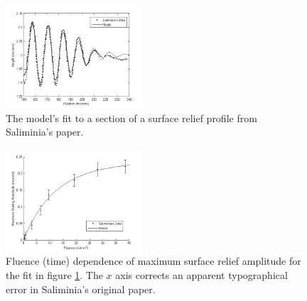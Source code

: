 \documentclass[aps, prl, twocolumn, groupedaddress]{revtex4-1}
\begin{document}
\begin{table}
\begin{ruledtabular}
  \end{ruledtabular}
  \caption{Summary of the parameters used in constructing the fit depicted in figure
                                                                                                                                                                                                                                                                                                                                                                                                                                                                                                                                \ref{fig:sinemodzoom}.} \label{tab:sinemod}
\end{table}

\begin{figure}[!htbp]
  \includegraphics[width=2in]{figure/sinefigurezoom.png}
  \caption{The model's fit to a section of a surface relief profile from Saliminia's paper.}
  \label{fig:sinemodzoom}
\end{figure}

\begin{figure}[!htbp]
  \includegraphics[width=2in]{figure/saliminiagrowth.png}
  \caption{Fluence (time) dependence of maximum surface relief amplitude for the fit in figure \ref{fig:sinemodzoom}. The $x$ axis corrects an apparent typographical error in Saliminia's original paper.}
  \label{fig:salgrowth}
\end{figure}

\end{document}
